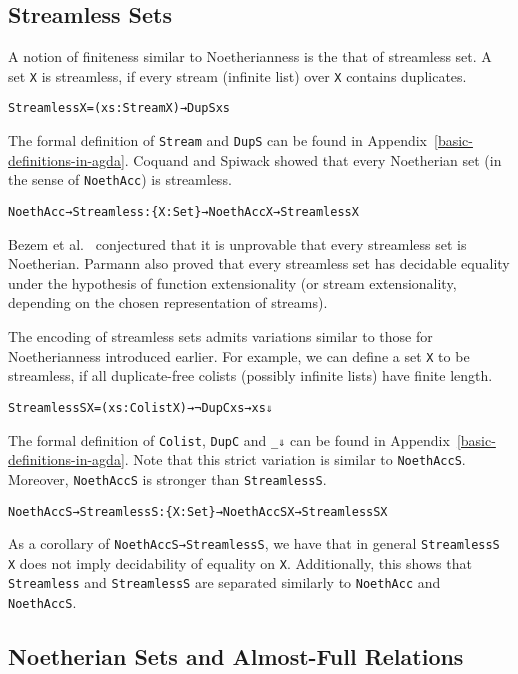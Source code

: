 \documentclass{eptcs}
\begin{document}
\subsection{Streamless Sets}
A notion of finiteness similar to Noetherianness is the that of streamless
set. A set \verb;X; is streamless, if every stream (infinite list) over \verb;X;
contains duplicates.
\begin{alltt}
Streamless X = (xs : Stream X) → DupS xs
\end{alltt}
The formal definition of \verb;Stream; and \verb;DupS; can be found in
Appendix~\ref{basic-definitions-in-agda}. Coquand and Spiwack \cite{Coquand} showed
that every Noetherian set (in the sense of \verb;NoethAcc;) is
streamless.
\begin{alltt}
NoethAcc→Streamless : \{X : Set\} → NoethAcc X → Streamless X
\end{alltt}
Bezem et al.~\cite{Bezem} conjectured that it is unprovable that every
streamless set is Noetherian.  Parmann \cite{Parmann} also proved that
every streamless set has decidable equality under the hypothesis of function
extensionality (or stream extensionality, depending on the chosen representation
of streams).

The encoding of streamless sets admits variations similar to those for
Noetherianness introduced earlier. For example, we can define a set \verb;X; to be
streamless, if all duplicate-free colists (possibly infinite lists) have finite
length.
\begin{alltt}
StreamlessS X = (xs : Colist X) → ¬ DupC xs → xs ⇓ 
\end{alltt}
The formal definition of \verb;Colist;, \verb;DupC; and \verb;_⇓; can
be found in Appendix~\ref{basic-definitions-in-agda}.  Note that this strict
variation is similar to \verb;NoethAccS;. Moreover, \verb;NoethAccS;
is stronger than \verb;StreamlessS;.
\begin{alltt}
NoethAccS→StreamlessS : \{X : Set\} → NoethAccS X → StreamlessS X
\end{alltt}
As a corollary of \verb;NoethAccS→StreamlessS;, we have that in general
\verb;StreamlessS X; does not imply decidability of equality on
\verb;X;. Additionally, this shows that \verb;Streamless; and \verb;StreamlessS;
are separated similarly to \verb;NoethAcc; and \verb;NoethAccS;.


\subsection{Noetherian Sets and Almost-Full Relations}
\end{document}
